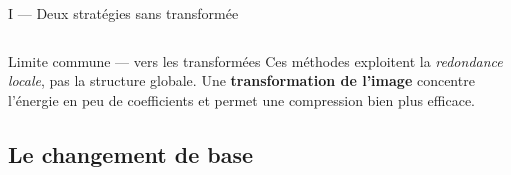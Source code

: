 \documentclass[10pt]{beamer}
\begin{document}
\begin{frame}{I — Deux stratégies sans transformée}
\begin{columns}[T]
		\end{columns}
		
		\bigskip
		\begin{alertblock}{Limite commune — vers les transformées}
			Ces méthodes exploitent la \emph{redondance locale}, pas la structure globale.
			Une \textbf{transformation de l'image} concentre l'énergie en peu de coefficients
			et permet une compression bien plus efficace.
		\end{alertblock}
		
	\end{frame}
	
	\subsection{Le changement de base}
\end{document}
